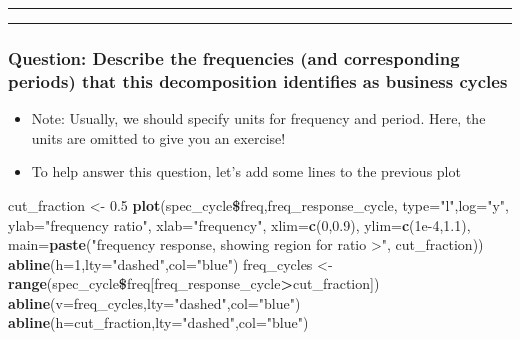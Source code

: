 \documentclass[]{article}
\newenvironment{Shaded}{\begin{snugshade}}{\end{snugshade}}
\newcommand{\KeywordTok}[1]{\textcolor[rgb]{0.13,0.29,0.53}{\textbf{#1}}}
\newcommand{\DataTypeTok}[1]{\textcolor[rgb]{0.13,0.29,0.53}{#1}}
\newcommand{\DecValTok}[1]{\textcolor[rgb]{0.00,0.00,0.81}{#1}}
\newcommand{\FloatTok}[1]{\textcolor[rgb]{0.00,0.00,0.81}{#1}}
\newcommand{\StringTok}[1]{\textcolor[rgb]{0.31,0.60,0.02}{#1}}
\newcommand{\OperatorTok}[1]{\textcolor[rgb]{0.81,0.36,0.00}{\textbf{#1}}}
\newcommand{\NormalTok}[1]{#1}
\begin{document}
\begin{center}\rule{0.5\linewidth}{\linethickness}\end{center}

\begin{center}\rule{0.5\linewidth}{\linethickness}\end{center}

\subsubsection{Question: Describe the frequencies (and corresponding
periods) that this decomposition identifies as business
cycles}\label{question-describe-the-frequencies-and-corresponding-periods-that-this-decomposition-identifies-as-business-cycles}

\begin{itemize}
\item
  Note: Usually, we should specify units for frequency and period. Here,
  the units are omitted to give you an exercise!
\item
  To help answer this question, let's add some lines to the previous
  plot
\end{itemize}

\begin{Shaded}
\begin{Highlighting}[]
\NormalTok{cut_fraction <-}\StringTok{ }\FloatTok{0.5}
\KeywordTok{plot}\NormalTok{(spec_cycle}\OperatorTok{\$}\NormalTok{freq,freq_response_cycle,}
  \DataTypeTok{type=}\StringTok{"l"}\NormalTok{,}\DataTypeTok{log=}\StringTok{"y"}\NormalTok{,}
  \DataTypeTok{ylab=}\StringTok{"frequency ratio"}\NormalTok{, }\DataTypeTok{xlab=}\StringTok{"frequency"}\NormalTok{, }\DataTypeTok{xlim=}\KeywordTok{c}\NormalTok{(}\DecValTok{0}\NormalTok{,}\FloatTok{0.9}\NormalTok{), }\DataTypeTok{ylim=}\KeywordTok{c}\NormalTok{(}\FloatTok{1e-4}\NormalTok{,}\FloatTok{1.1}\NormalTok{),}
  \DataTypeTok{main=}\KeywordTok{paste}\NormalTok{(}\StringTok{"frequency response, showing region for ratio >"}\NormalTok{, cut_fraction))}
\KeywordTok{abline}\NormalTok{(}\DataTypeTok{h=}\DecValTok{1}\NormalTok{,}\DataTypeTok{lty=}\StringTok{"dashed"}\NormalTok{,}\DataTypeTok{col=}\StringTok{"blue"}\NormalTok{)  }
\NormalTok{freq_cycles <-}\StringTok{ }\KeywordTok{range}\NormalTok{(spec_cycle}\OperatorTok{\$}\NormalTok{freq[freq_response_cycle}\OperatorTok{>}\NormalTok{cut_fraction]) }
\KeywordTok{abline}\NormalTok{(}\DataTypeTok{v=}\NormalTok{freq_cycles,}\DataTypeTok{lty=}\StringTok{"dashed"}\NormalTok{,}\DataTypeTok{col=}\StringTok{"blue"}\NormalTok{) }
\KeywordTok{abline}\NormalTok{(}\DataTypeTok{h=}\NormalTok{cut_fraction,}\DataTypeTok{lty=}\StringTok{"dashed"}\NormalTok{,}\DataTypeTok{col=}\StringTok{"blue"}\NormalTok{)}
\end{Highlighting}
\end{Shaded}
\end{document}
